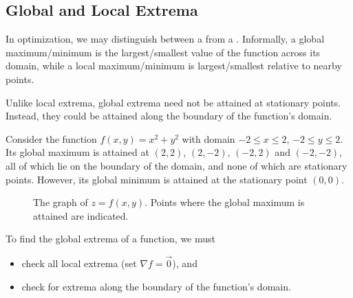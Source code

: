 \subsection{Global and Local Extrema}

In optimization, we may distinguish between a  from a . Informally, a global maximum/minimum is the largest/smallest value of the function across its domain, while a local maximum/minimum is largest/smallest relative to nearby points.

Unlike local extrema, global extrema need not be attained at stationary points. Instead, they could be attained along the boundary of the function's domain.

\begin{example}
    Consider the function $f(x, y) = x^2 + y^2$ with domain $-2 \leq x \leq 2$, $-2\leq y \leq 2$. Its global maximum is attained at $(2, 2)$, $(2, -2)$, $(-2, 2)$ and $(-2, -2)$, all of which lie on the boundary of the domain, and none of which are stationary points. However, its global minimum is attained at the stationary point $(0, 0)$.

    \begin{figure}[H]
    \centering
    \caption{The graph of $z = f(x, y)$. Points where the global maximum is attained are indicated.}
\end{figure}
\end{example}

\begin{recipe}
    To find the global extrema of a function, we must
    \begin{itemize}
        \item check all local extrema (set $\nabla f = \vec 0$), and
        \item check for extrema along the boundary of the function's domain.
    \end{itemize}
\end{recipe}

